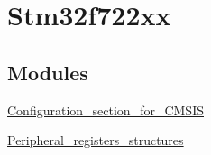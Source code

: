 \hypertarget{group__stm32f722xx}{}\section{Stm32f722xx}
\label{group__stm32f722xx}
\subsection*{Modules}
\begin{DoxyCompactItemize}
\item 
\mbox{\hyperlink{group___configuration__section__for___c_m_s_i_s}{Configuration\+\_\+section\+\_\+for\+\_\+\+C\+M\+S\+IS}}
\item 
\mbox{\hyperlink{group___peripheral__registers__structures}{Peripheral\+\_\+registers\+\_\+structures}}
\end{DoxyCompactItemize}
